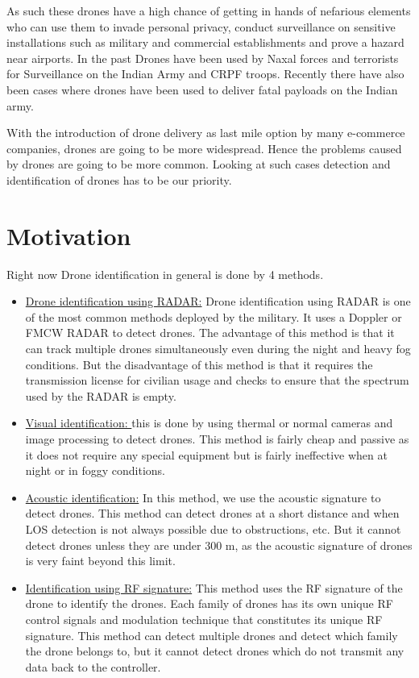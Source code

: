 \noindent As such these drones have a high chance of getting in hands of nefarious elements who can use them to invade personal privacy, conduct surveillance on sensitive installations such as military and commercial establishments and prove a hazard near airports.
In the past Drones have been used by Naxal forces and terrorists for Surveillance on the Indian Army and CRPF troops. Recently there have also been cases where drones have been used to deliver fatal payloads on the  Indian army.

\noindent With the introduction of drone delivery as last mile option by many e-commerce companies, drones are going to be more widespread. Hence the problems caused by drones are going to be more common.  Looking at such cases detection and identification of drones has to be our priority.

\section{Motivation}\label{Motivation}

\noindent Right now Drone identification in general is done by 4 methods. 
\begin{itemize}
  \item \underline{Drone identification using RADAR:} Drone identification using RADAR is one of the most common methods deployed by the military. It uses a Doppler or FMCW RADAR to detect drones. The advantage of this method is that it can track multiple drones simultaneously even during the night and heavy fog conditions. But the disadvantage of this method is that it requires the transmission license for civilian usage and checks to ensure that the spectrum used by the RADAR is empty.
  \item \underline{Visual identification: }this is done by using thermal or normal cameras and image processing to detect drones. This method is fairly cheap and passive as it does not require any special equipment but is fairly ineffective when at night or in foggy conditions.

  \item \underline{Acoustic identification:} In this method, we use the acoustic signature to detect drones. This method can detect drones at a short distance and when LOS detection is not always possible due to obstructions, etc. But it cannot detect drones unless they are under 300 m, as the acoustic signature of drones is very faint beyond this limit.
  \item \underline{Identification using RF signature:} This method uses the RF signature of the drone to identify the drones. Each family of drones has its own unique RF control signals and modulation technique that constitutes its unique RF signature. This method can detect multiple drones and detect which family the drone belongs to, but it cannot detect drones which do not transmit any data back to the controller.
\end{itemize}


